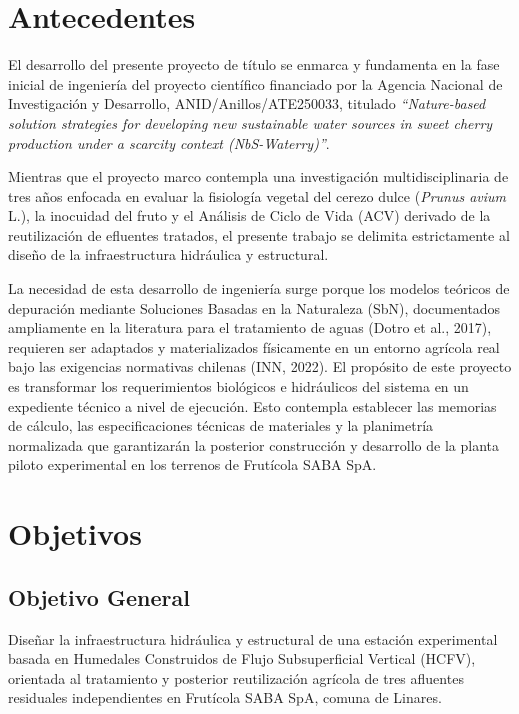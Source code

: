 \documentclass[12pt, letterpaper]{report}
\begin{document}
\section{Antecedentes}
El desarrollo del presente proyecto de título se enmarca y fundamenta en la fase inicial de ingeniería del proyecto científico financiado por la Agencia Nacional de Investigación y Desarrollo, ANID/Anillos/ATE250033, titulado \textit{“Nature-based solution strategies for developing new sustainable water sources in sweet cherry production under a scarcity context (NbS-Waterry)”}.

Mientras que el proyecto marco contempla una investigación multidisciplinaria de tres años enfocada en evaluar la fisiología vegetal del cerezo dulce (\textit{Prunus avium} L.), la inocuidad del fruto y el Análisis de Ciclo de Vida (ACV) derivado de la reutilización de efluentes tratados, el presente trabajo se delimita estrictamente al diseño de la infraestructura hidráulica y estructural.

La necesidad de esta desarrollo de ingeniería surge porque los modelos teóricos de depuración mediante Soluciones Basadas en la Naturaleza (SbN), documentados ampliamente en la literatura para el tratamiento de aguas (Dotro et al., 2017), requieren ser adaptados y materializados físicamente en un entorno agrícola real bajo las exigencias normativas chilenas (INN, 2022). El propósito de este proyecto es transformar los requerimientos biológicos e hidráulicos del sistema en un expediente técnico a nivel de ejecución. Esto contempla establecer las memorias de cálculo, las especificaciones técnicas de materiales y la planimetría normalizada que garantizarán la posterior construcción y desarrollo de la planta piloto experimental en los terrenos de Frutícola SABA SpA.


\newpage


\section{Objetivos}

\subsection{Objetivo General}
Diseñar la infraestructura hidráulica y estructural de una estación experimental basada en Humedales Construidos de Flujo Subsuperficial Vertical (HCFV), orientada al tratamiento y posterior reutilización agrícola de tres afluentes residuales independientes en Frutícola SABA SpA, comuna de Linares.
\end{document}
